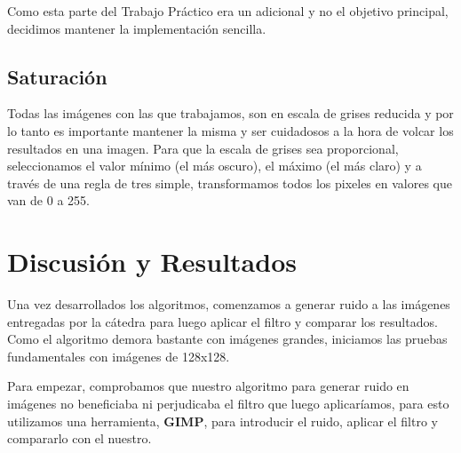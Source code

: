 \documentclass[a4paper]{article}
\begin{document}
Como esta parte del Trabajo Práctico era un adicional y no el objetivo principal, decidimos mantener la implementación sencilla.

\subsection{Saturación}

Todas las imágenes con las que trabajamos, son en escala de grises reducida y por lo tanto es importante mantener la misma y ser cuidadosos a la hora de volcar los resultados en una imagen. Para que la escala de grises sea proporcional, seleccionamos el valor mínimo (el más oscuro), el máximo (el más claro) y a través de una regla de tres simple, transformamos todos los pixeles en valores que van de 0 a 255.


\newpage

\section{Discusión y Resultados}


Una vez desarrollados los algoritmos, comenzamos a generar ruido a las imágenes entregadas por la cátedra para luego aplicar el filtro y comparar los resultados. Como el algoritmo demora bastante con imágenes grandes, iniciamos las pruebas fundamentales con imágenes de 128x128. \vspace{1em}

Para empezar, comprobamos que nuestro algoritmo para generar ruido en imágenes no beneficiaba ni perjudicaba el filtro que luego aplicaríamos, para esto utilizamos una herramienta, \textbf{GIMP}, para introducir el ruido, aplicar el filtro y compararlo con el nuestro.
\end{document}
